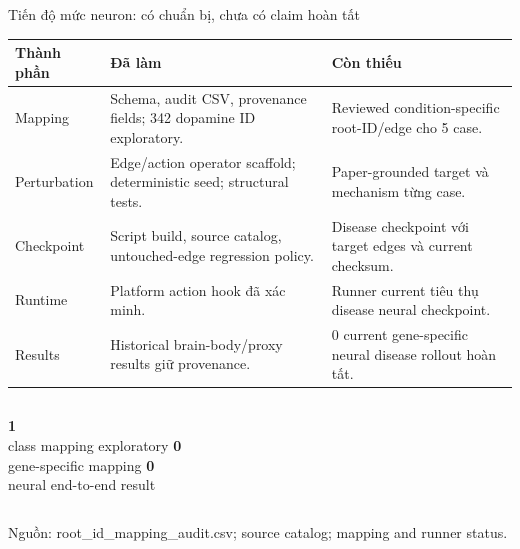 \documentclass[10pt,aspectratio=169]{beamer}
\newcommand{\source}[1]{\par\vfill{\fontsize{6.0}{7}\selectfont\color{gray}Nguồn: #1\par}}
\newcommand{\smallgap}{\vspace{0.18cm}}
\begin{document}
\begin{frame}{Tiến độ mức neuron: có chuẩn bị, chưa có claim hoàn tất}
\renewcommand{\arraystretch}{1.22}\scriptsize
\begin{tabular}{@{}L{2.4cm}L{6.7cm}L{5.4cm}@{}}
\toprule
\textbf{Thành phần} & \textbf{Đã làm} & \textbf{Còn thiếu}\\\midrule
Mapping & Schema, audit CSV, provenance fields; 342 dopamine ID exploratory. & Reviewed condition-specific root-ID/edge cho 5 case.\\
Perturbation & Edge/action operator scaffold; deterministic seed; structural tests. & Paper-grounded target và mechanism từng case.\\
Checkpoint & Script build, source catalog, untouched-edge regression policy. & Disease checkpoint với target edges và current checksum.\\
Runtime & Platform action hook đã xác minh. & Runner current tiêu thụ disease neural checkpoint.\\
Results & Historical brain-body/proxy results giữ provenance. & 0 current gene-specific neural disease rollout hoàn tất.\\\bottomrule
\end{tabular}
\smallgap
\begin{columns}[T,onlytextwidth]
\centering \textcolor{accent}{\fontsize{22}{24}\selectfont\bfseries 1}\\\small class mapping exploratory
\centering \textcolor{uitblue}{\fontsize{22}{24}\selectfont\bfseries 0}\\\small gene-specific mapping
\centering \textcolor{uitblue}{\fontsize{22}{24}\selectfont\bfseries 0}\\\small neural end-to-end result
\end{columns}
\source{root\_id\_mapping\_audit.csv; source catalog; mapping and runner status.}
\end{frame}
\end{document}
